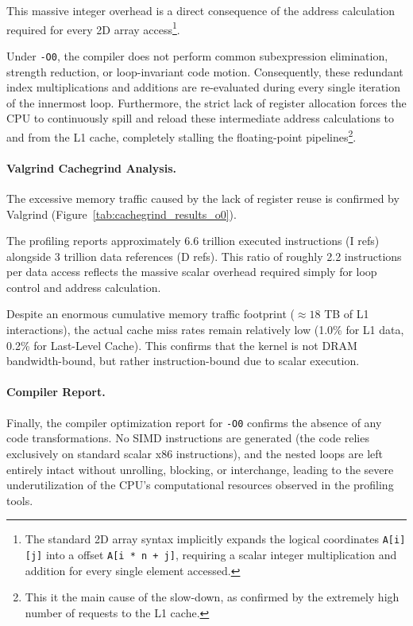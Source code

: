 This massive integer overhead is a direct consequence of the address calculation required for every 2D array access\footnote{The standard 2D array syntax implicitly expands the logical coordinates \texttt{A[i][j]} into a offset \texttt{A[i * n + j]}, requiring a scalar integer multiplication and addition for every single element accessed.}.

Under \texttt{-O0}, the compiler does not perform common subexpression elimination, strength reduction, or loop-invariant code motion. Consequently, these redundant index multiplications and additions are re-evaluated during every single iteration of the innermost loop. Furthermore, the strict lack of register allocation forces the CPU to continuously spill and reload these intermediate address calculations to and from the L1 cache, completely stalling the floating-point pipelines\footnote{This it the main cause of the slow-down, as confirmed by the extremely high number of requests to the L1 cache.}.


\paragraph{Valgrind Cachegrind Analysis.}
The excessive memory traffic caused by the lack of register reuse is confirmed by Valgrind (Figure~\ref{tab:cachegrind_results_o0}). 



The profiling reports approximately 6.6 trillion executed instructions (I refs) alongside 3 trillion data references (D refs). This ratio of roughly 2.2 instructions per data access reflects the massive scalar overhead required simply for loop control and address calculation. 

Despite an enormous cumulative memory traffic footprint ($\approx 18$ TB of L1 interactions), the actual cache miss rates remain relatively low (1.0\% for L1 data, 0.2\% for Last-Level Cache). This confirms that the kernel is not DRAM bandwidth-bound, but rather instruction-bound due to scalar execution.


\paragraph{Compiler Report.}
Finally, the compiler optimization report for \texttt{-O0} confirms the absence of any code transformations. No SIMD instructions are generated (the code relies exclusively on standard scalar x86 instructions), and the nested loops are left entirely intact without unrolling, blocking, or interchange, leading to the severe underutilization of the CPU's computational resources observed in the profiling tools.